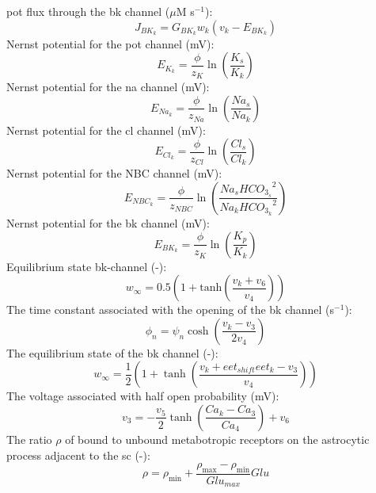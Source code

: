 \documentclass[11pt]{elsarticle}
\newcommand{\mus}{$\mu$M s$^{-1}$\xspace}
\newcommand{\psec}{s$^{-1}$\xspace}
\newcommand{\na}{\gls{na}\xspace}
\newcommand{\pot}{\gls{pot}\xspace}
\newcommand{\cl}{\gls{cl}\xspace}
\begin{document}
%
\pot flux through the \gls{bk} channel (\mus): 
\begin{equation} \label{eq:J_BK}
J_{BK_k}= G_{BK_k}w_k\left( v_k-E_{BK_k} \right)
\end{equation}
%
Nernst potential for the \pot channel (mV):
\begin{equation} \label{eq:E_K}
E_{K_k}=\frac{\phi}{z_K}\ln\left( \frac{K_s}{K_k}\right) 
\end{equation}
%
Nernst potential for the \na channel (mV):
\begin{equation} \label{eq:E_Na}
E_{Na_k}=\frac{\phi}{z_{Na}}\ln\left( \frac{Na_s}{Na_k}\right) 
\end{equation}
%
Nernst potential for the \cl channel (mV):
\begin{equation} \label{eq:E_Cl}
E_{Cl_k}=\frac{\phi}{z_{Cl}}\ln\left( \frac{Cl_s}{Cl_k}\right) 
\end{equation}
%
Nernst potential for the NBC channel (mV):
\begin{equation} \label{eq:E_NBC}
E_{NBC_k}=\frac{\phi}{z_{NBC}}\ln\left( \frac{Na_s {HCO_{3_s}}^2}{Na_k {HCO_{3_k}}^2}\right) 
\end{equation}
Nernst potential for the \gls{bk} channel (mV):
\begin{equation} \label{eq:E_BK}
E_{BK_k}=\frac{\phi}{z_K}\ln\left( \frac{K_p}{K_k}\right) 
\end{equation}
%
Equilibrium state \gls{bk}-channel (-):
\begin{equation} \label{eq:winf}
w_{\infty}=0.5 \left(1+\mathrm{tanh}\left(\frac{v_{k}+v_{6} }{v_{4}} \right)  \right) 
\end{equation}
%
The time constant associated with the opening of the \gls{bk} channel (\psec):
\begin{equation}
\phi_n = \psi_n \cosh \left( \frac{v_k - v_3}{2 v_4} \right)
\end{equation}
%
The equilibrium state of the \gls{bk} channel (-):
\begin{equation}
w_{\infty} = \frac{1}{2} \left( 1 + \tanh \left( \frac{v_k + eet_{shift} eet_k - v_3}{v_4}  \right)  \right)
\end{equation}
%
The voltage associated with half open probability (mV):
\begin{equation}
v_3 = - \frac{v_5}{2} \tanh \left(  \frac{Ca_k - Ca_3}{Ca_4}  \right) + v_6
\end{equation}
%
The ratio $\rho$ of bound to unbound metabotropic receptors on the astrocytic process adjacent to the \gls{sc} (-):
\begin{equation}
\rho = \rho_{\text{min}} + \frac{\rho_{\text{max}} - \rho_{\text{min}}}{Glu_{max}}
Glu
\end{equation}
\end{document}

